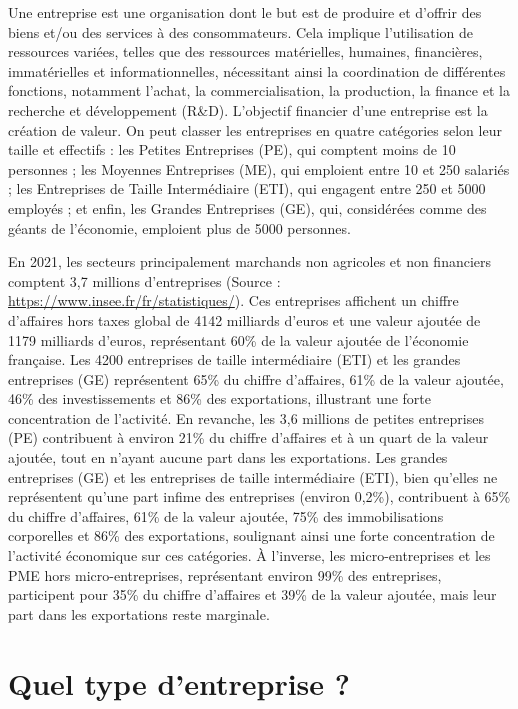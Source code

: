 \documentclass[a4paper, 12pt]{report}
\begin{document}
Une entreprise est une organisation dont le but est de produire et d'offrir des biens et/ou des services à des consommateurs. Cela implique l'utilisation de ressources variées, telles que des ressources matérielles, humaines, financières, immatérielles et informationnelles, nécessitant ainsi la coordination de différentes fonctions, notamment l'achat, la commercialisation, la production, la finance et la recherche et développement (R\&D). L'objectif financier d'une entreprise est la création de valeur. On peut classer les entreprises en quatre catégories selon leur taille et effectifs : les Petites Entreprises (PE), qui comptent moins de 10 personnes ; les Moyennes Entreprises (ME), qui emploient entre 10 et 250 salariés ; les Entreprises de Taille Intermédiaire (ETI), qui engagent entre 250 et 5000 employés ; et enfin, les Grandes Entreprises (GE), qui, considérées comme des géants de l'économie, emploient plus de 5000 personnes.

En 2021, les secteurs principalement marchands non agricoles et non financiers comptent 3,7 millions d'entreprises (Source : \url{https://www.insee.fr/fr/statistiques/}). Ces entreprises affichent un chiffre d'affaires hors taxes global de 4142 milliards d'euros et une valeur ajoutée de 1179 milliards d'euros, représentant 60\% de la valeur ajoutée de l'économie française. Les 4200 entreprises de taille intermédiaire (ETI) et les grandes entreprises (GE) représentent 65\% du chiffre d'affaires, 61\% de la valeur ajoutée, 46\% des investissements et 86\% des exportations, illustrant une forte concentration de l'activité. En revanche, les 3,6 millions de petites entreprises (PE) contribuent à environ 21\% du chiffre d'affaires et à un quart de la valeur ajoutée, tout en n'ayant aucune part dans les exportations. Les grandes entreprises (GE) et les entreprises de taille intermédiaire (ETI), bien qu'elles ne représentent qu'une part infime des entreprises (environ 0,2\%), contribuent à 65\% du chiffre d'affaires, 61\% de la valeur ajoutée, 75\% des immobilisations corporelles et 86\% des exportations, soulignant ainsi une forte concentration de l'activité économique sur ces catégories. À l'inverse, les micro-entreprises et les PME hors micro-entreprises, représentant environ 99\% des entreprises, participent pour 35\% du chiffre d'affaires et 39\% de la valeur ajoutée, mais leur part dans les exportations reste marginale.

\section{Quel type d'entreprise ?}
	
\end{document}
